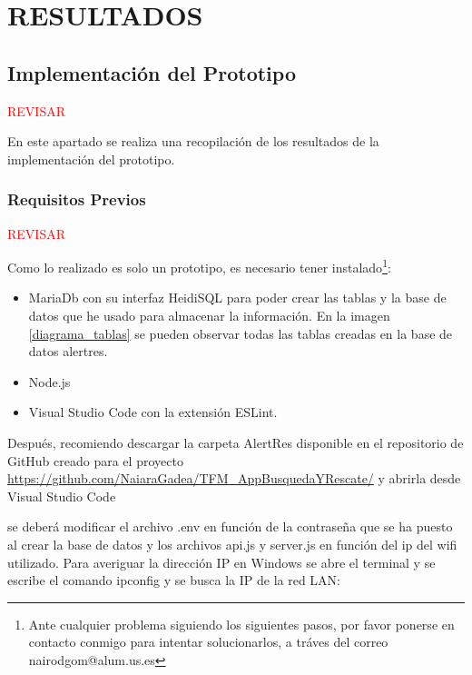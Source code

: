 
\chapter{RESULTADOS}\label{ejecucion}


\section{Implementación del Prototipo}\label{desa}
\textcolor{red}{REVISAR}

En este apartado se realiza una recopilación de los resultados de la implementación del prototipo. 

\subsection{Requisitos Previos}
\textcolor{red}{REVISAR}

Como lo realizado es solo un prototipo, es necesario tener instalado\footnote{Ante cualquier problema siguiendo los siguientes pasos, por favor ponerse en contacto conmigo para intentar solucionarlos, a tráves del correo nairodgom@alum.us.es}:
\begin{itemize}
    \item MariaDb con su interfaz HeidiSQL para poder crear las tablas y la base de datos que he usado para almacenar la información. En la imagen \ref{diagrama_tablas} se pueden observar todas las tablas creadas en la base de datos alertres.

    \item Node.js

    \item Visual Studio Code con la extensión ESLint.
\end{itemize}



Después, recomiendo descargar la carpeta AlertRes disponible en el repositorio de GitHub creado para el proyecto \url{https://github.com/NaiaraGadea/TFM_AppBusquedaYRescate/} y abrirla desde Visual Studio Code

se deberá modificar el archivo .env en función de la contraseña que se ha puesto al crear la base de datos y los archivos api.js y server.js en función del ip del wifi utilizado. Para averiguar la dirección IP en Windows se abre el terminal y se escribe el comando ipconfig y se busca la IP de la red LAN:

